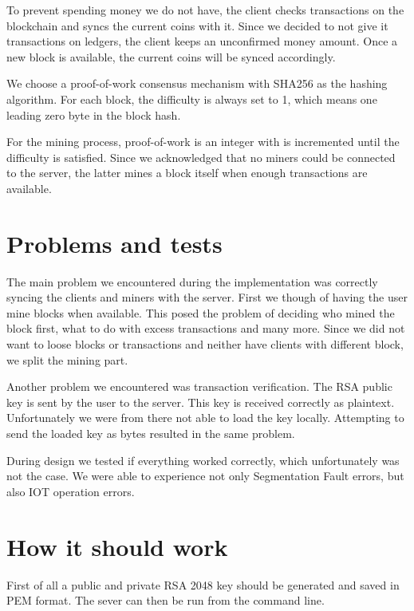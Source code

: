 \documentclass{article}
\begin{document}
To prevent spending money we do not have, the client checks transactions on the blockchain and syncs the current coins with it. Since we decided to not give it transactions on ledgers, the client keeps an unconfirmed money amount. Once a new block is available, the current coins will be synced accordingly. \\ \par

We choose a proof-of-work consensus mechanism with SHA256 as the hashing algorithm. For each block, the difficulty is always set to 1, which means one leading zero byte in the block hash. \\ \par

For the mining process, proof-of-work is an integer with is incremented until the difficulty is satisfied. Since we acknowledged that no miners could be connected to the server, the latter mines a block itself when enough transactions are available.

\section{Problems and tests}
The main problem we encountered during the implementation was correctly syncing the clients and miners with the server. First we though of having the user mine blocks when available. This posed the problem of deciding who mined the block first, what to do with excess transactions and many more. Since we did not want to loose blocks or transactions and neither have clients with different block, we split the mining part. \\ \par

Another problem we encountered was transaction verification. The RSA public key is sent by the user to the server. This key is received correctly as plaintext. Unfortunately we were from there not able to load the key locally. Attempting to send the loaded key as bytes resulted in the same problem. \\ \par

During design we tested if everything worked correctly, which unfortunately was not the case. We were able to experience not only Segmentation Fault errors, but also IOT operation errors.

\section{How it should work}
First of all a public and private RSA 2048 key should be generated and saved in PEM format. The sever can then be run from the command line. 
\end{document}
